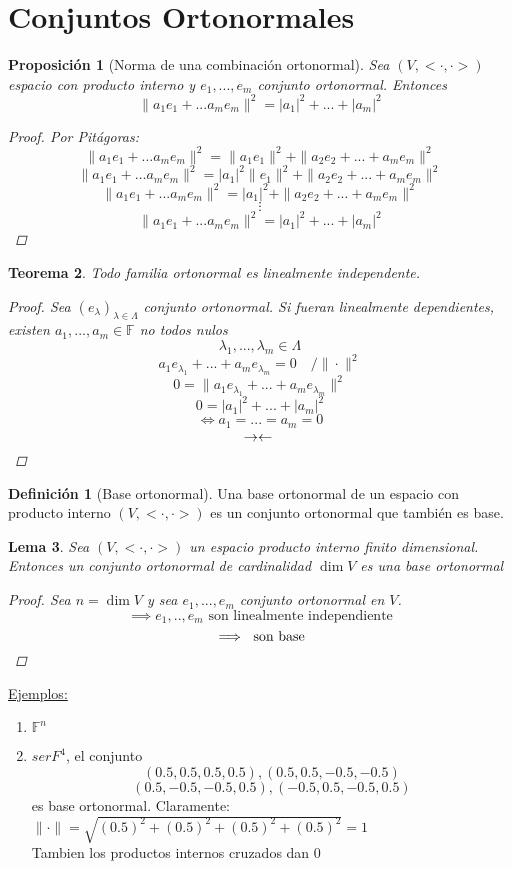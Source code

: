 \documentclass[11pt]{book}
\newcommand{\set}[1]{\mathbb{#1}}
\newcommand{\contr}{\rightarrow\leftarrow}
\newtheorem{thm}{Teorema}[section]
\newtheorem{lem}[thm]{Lema}
\newtheorem{prop}[thm]{Proposición}
\theoremstyle{definition}
\newtheorem{defn}{Definición}[section]
\begin{document}
\section{Conjuntos Ortonormales}

\begin{prop}[Norma de una combinación ortonormal]
	Sea $(V,<\cdot,\cdot>)$ espacio con producto interno y $e_1,...,e_m$ conjunto ortonormal. Entonces
	\[\|a_1e_1+...a_me_m\|^2=|a_1|^2+...+|a_m|^2\]
	\begin{proof}
		Por Pitágoras:
		\[\|a_1e_1+...a_me_m\|^2=\|a_1e_1\|^2+\|a_2e_2+...+a_me_m\|^2\]
		\[\|a_1e_1+...a_me_m\|^2=|a_1|^2\|e_1\|^2+\|a_2e_2+...+a_me_m\|^2\]
		\[\|a_1e_1+...a_me_m\|^2=|a_1|^2+\|a_2e_2+...+a_me_m\|^2\]
		\[\vdots\]
		\[\|a_1e_1+...a_me_m\|^2=|a_1|^2+...+|a_m|^2\]
	\end{proof}
\end{prop}
\begin{thm}
	Todo familia ortonormal es linealmente independente.
	\begin{proof}
		Sea $(e_\lambda)_{\lambda\in\Lambda}$ conjunto ortonormal. Si fueran linealmente dependientes, existen $a_1,...,a_m\in\set{F}$ no todos nulos
		\[\lambda_1,...,\lambda_m\in\Lambda\]
		\[a_1e_{\lambda_1}+...+a_me_{\lambda_m}=0\quad /\|\cdot\|^2\]
		\[0=\|a_1e_{\lambda_1}+...+a_me_{\lambda_m}\|^2\]
		\[0=|a_1|^2+...+|a_m|^2\]
		\[\iff a_1=...=a_m=0\]
		\[\contr\qedhere\]
	\end{proof}
\end{thm}
\begin{defn}[Base ortonormal]
	Una base ortonormal de un espacio con producto interno $(V,<\cdot,\cdot>)$ es un conjunto ortonormal que también es base.
\end{defn}
\begin{lem}
	Sea $(V,<\cdot,\cdot>)$ un espacio producto interno finito dimensional. Entonces un conjunto ortonormal de cardinalidad $\dim V$ es una base ortonormal
	\begin{proof}
		Sea $n=\dim V$ y sea $e_1,...,e_m$ conjunto ortonormal en $V$.
		\[\implies e_1,..,e_m\textrm{ son linealmente independiente}\]
		\[\implies\textrm{ son base}\qedhere\]
	\end{proof}
\end{lem}
\underline{Ejemplos:}
\begin{enumerate}
	\item $\set{F}^n$

	\item $ser{F}^4$, el conjunto
	\[(0.5,0.5,0.5,0.5),(0.5,0.5,-0.5,-0.5)\]
	\[(0.5,-0.5,-0.5,0.5),(-0.5,0.5,-0.5,0.5)\]
	es base ortonormal.
	Claramente: $\|\cdot\|=\sqrt{(0.5)^2+(0.5)^2+(0.5)^2+(0.5)^2}=1$\\
	Tambien los productos internos cruzados dan 0
\end{enumerate}
\end{document}
